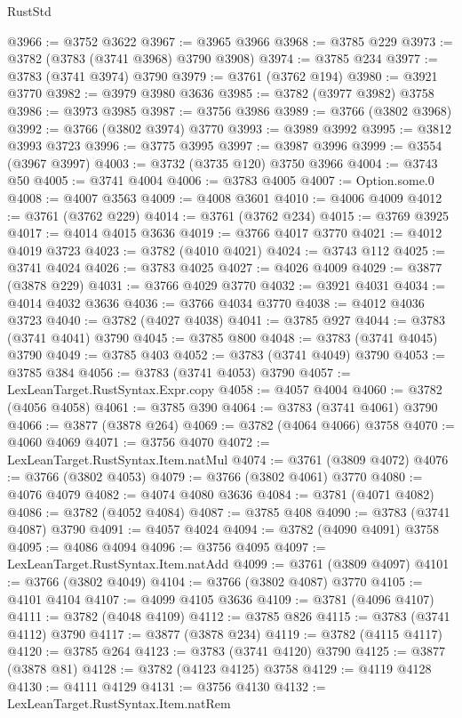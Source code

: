 \begin{lexlean}{RustStd}
\begin{coremodule}
@3966 := @3752 @3622
@3967 := @3965 @3966
@3968 := @3785 @229
@3973 := @3782 (@3783 (@3741 @3968) @3790 @3908)
@3974 := @3785 @234
@3977 := @3783 (@3741 @3974) @3790
@3979 := @3761 (@3762 @194)
@3980 := @3921 @3770
@3982 := @3979 @3980 @3636
@3985 := @3782 (@3977 @3982) @3758
@3986 := @3973 @3985
@3987 := @3756 @3986
@3989 := @3766 (@3802 @3968)
@3992 := @3766 (@3802 @3974) @3770
@3993 := @3989 @3992
@3995 := @3812 @3993 @3723
@3996 := @3775 @3995
@3997 := @3987 @3996
@3999 := @3554 (@3967 @3997)
@4003 := @3732 (@3735 @120) @3750 @3966
@4004 := @3743 @50
@4005 := @3741 @4004
@4006 := @3783 @4005
@4007 := Option.some.{0}
@4008 := @4007 @3563
@4009 := @4008 @3601
@4010 := @4006 @4009
@4012 := @3761 (@3762 @229)
@4014 := @3761 (@3762 @234)
@4015 := @3769 @3925
@4017 := @4014 @4015 @3636
@4019 := @3766 @4017 @3770
@4021 := @4012 @4019 @3723
@4023 := @3782 (@4010 @4021)
@4024 := @3743 @112
@4025 := @3741 @4024
@4026 := @3783 @4025
@4027 := @4026 @4009
@4029 := @3877 (@3878 @229)
@4031 := @3766 @4029 @3770
@4032 := @3921 @4031
@4034 := @4014 @4032 @3636
@4036 := @3766 @4034 @3770
@4038 := @4012 @4036 @3723
@4040 := @3782 (@4027 @4038)
@4041 := @3785 @927
@4044 := @3783 (@3741 @4041) @3790
@4045 := @3785 @800
@4048 := @3783 (@3741 @4045) @3790
@4049 := @3785 @403
@4052 := @3783 (@3741 @4049) @3790
@4053 := @3785 @384
@4056 := @3783 (@3741 @4053) @3790
@4057 := LexLeanTarget.RustSyntax.Expr.copy
@4058 := @4057 @4004
@4060 := @3782 (@4056 @4058)
@4061 := @3785 @390
@4064 := @3783 (@3741 @4061) @3790
@4066 := @3877 (@3878 @264)
@4069 := @3782 (@4064 @4066) @3758
@4070 := @4060 @4069
@4071 := @3756 @4070
@4072 := LexLeanTarget.RustSyntax.Item.natMul
@4074 := @3761 (@3809 @4072)
@4076 := @3766 (@3802 @4053)
@4079 := @3766 (@3802 @4061) @3770
@4080 := @4076 @4079
@4082 := @4074 @4080 @3636
@4084 := @3781 (@4071 @4082)
@4086 := @3782 (@4052 @4084)
@4087 := @3785 @408
@4090 := @3783 (@3741 @4087) @3790
@4091 := @4057 @4024
@4094 := @3782 (@4090 @4091) @3758
@4095 := @4086 @4094
@4096 := @3756 @4095
@4097 := LexLeanTarget.RustSyntax.Item.natAdd
@4099 := @3761 (@3809 @4097)
@4101 := @3766 (@3802 @4049)
@4104 := @3766 (@3802 @4087) @3770
@4105 := @4101 @4104
@4107 := @4099 @4105 @3636
@4109 := @3781 (@4096 @4107)
@4111 := @3782 (@4048 @4109)
@4112 := @3785 @826
@4115 := @3783 (@3741 @4112) @3790
@4117 := @3877 (@3878 @234)
@4119 := @3782 (@4115 @4117)
@4120 := @3785 @264
@4123 := @3783 (@3741 @4120) @3790
@4125 := @3877 (@3878 @81)
@4128 := @3782 (@4123 @4125) @3758
@4129 := @4119 @4128
@4130 := @4111 @4129
@4131 := @3756 @4130
@4132 := LexLeanTarget.RustSyntax.Item.natRem

\end{coremodule}
\end{lexlean}
